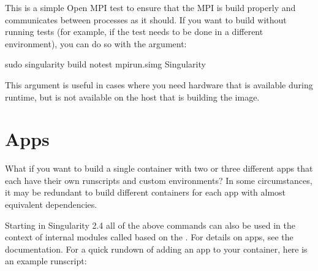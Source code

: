 \documentclass[letterpaper,10pt,english]{sphinxmanual}
\begin{document}
This is a simple Open MPI test to ensure that the MPI is build
properly and communicates between processes as it should.
If you want to build without running tests (for example, if the test
needs to be done in a different environment), you can do so with the
 argument:

%
\begin{sphinxVerbatim}[commandchars=\\\{\}]
\PYGZdl{} sudo singularity build \PYGZhy{}\PYGZhy{}notest mpirun.simg Singularity
\end{sphinxVerbatim}

This argument is useful in cases where you need hardware that is
available during runtime, but is not available on the host that is
building the image.


\section{Apps}
\label{\detokenize{container_recipes:apps}}
What if you want to build a single container with two or three
different apps that each have their own runscripts and custom
environments? In some circumstances, it may be redundant to build
different containers for each app with almost equivalent dependencies.

Starting in Singularity 2.4 all of the above commands can also be used
in the context of internal modules called  based on the . For details on apps, see the 
documentation. For a quick rundown of adding an app to your container,
here is an example runscript:
\end{document}
